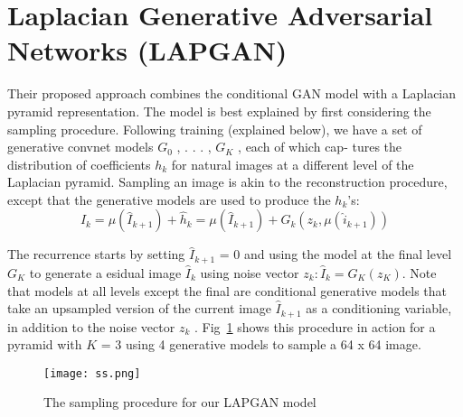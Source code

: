 \documentclass[10pt,twocolumn,letterpaper]{article}
\begin{document}
\section{Laplacian Generative Adversarial Networks (LAPGAN)}
Their proposed approach combines the conditional GAN model with a Laplacian pyramid representation. The model is best explained by first considering the sampling procedure. Following training (explained below), we have a set of generative convnet models {$G_0$ , . . . , $G_K$ }, each of which cap-
tures the distribution of coefficients $h_k$ for natural images at a different level of the Laplacian pyramid. Sampling an image is akin to the reconstruction procedure, except that the generative models are used to produce the $h_k$'s:
\begin{equation}
\hat{I}_k=\mu(\hat{I}_{k+1})+\hat{h}_k=\mu(\hat{I}_{k+1})+G_k(z_k,\mu(\hat{i}_{k+1}))
\end{equation}
\par The recurrence starts by setting $\hat{I}_{k+1}$ = 0 and using the model at the final level $G_K$ to generate a esidual image $\hat{I}_k$ using noise vector $z_k:\hat{I}_k =G_K(z_K )$. Note that models at all levels except the final are conditional generative models that take an upsampled version of the current image $\hat{I}_{k+1}$ as
a conditioning variable, in addition to the noise vector $z_k$ . Fig~\ref{Fig1} shows this procedure in action for
a pyramid with $K$ = 3 using 4 generative models to sample a 64 x 64 image.
\begin{figure}[!htb]
	\centering
	\texttt{[image: ss.png]}\\
	\caption{The sampling procedure for our LAPGAN model}\label{Fig1}
\end{figure}


\end{document}
